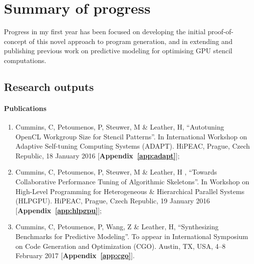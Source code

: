\section{Summary of progress}

Progress in my first year has been focused on developing the initial proof-of-concept of this novel approach to program generation, and in extending and publishing previous work on predictive modeling for optimising GPU stencil computations.

\newpage
\subsection{Research outputs}

\paragraph{Publications}
\begin{enumerate}
  \item Cummins, C, Petoumenos, P, Steuwer, M \& Leather, H, ``Autotuning OpenCL Workgroup Size for Stencil Patterns''. In International Workshop on Adaptive Self-tuning Computing Systems (ADAPT). HiPEAC, Prague, Czech Republic, 18 January 2016 [\textbf{Appendix~\ref{app:adapt}}];
  \item Cummins, C, Petoumenos, P, Steuwer, M \& Leather, H , ``Towards Collaborative Performance Tuning of Algorithmic Skeletons''. In Workshop on High-Level Programming for Heterogeneous \& Hierarchical Parallel Systems (HLPGPU). HiPEAC, Prague, Czech Republic, 19 January 2016 [\textbf{Appendix~\ref{app:hlpgpu}}];
  \item Cummins, C, Petoumenos, P, Wang, Z \& Leather, H, ``Synthesizing Benchmarks for Predictive Modeling''. To appear in International Symposium on Code Generation and Optimization (CGO). Austin, TX, USA, 4--8 February 2017 [\textbf{Appendix~\ref{app:cgo}}].
\end{enumerate}

